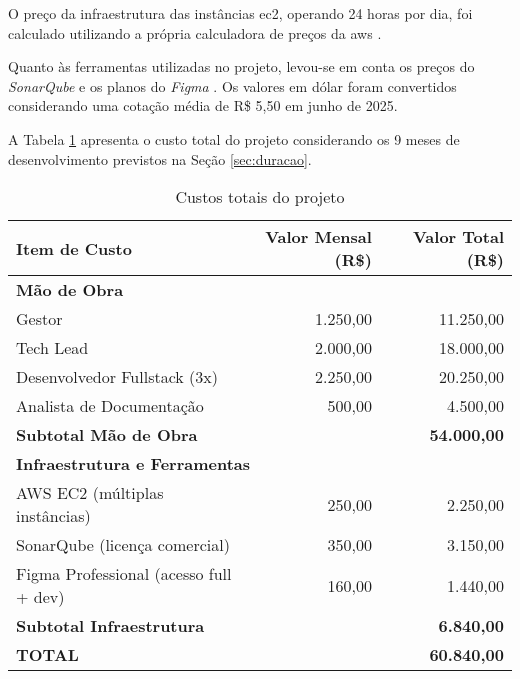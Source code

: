 O preço da infraestrutura das instâncias \gls{ec2}, operando 24 horas por dia, foi calculado utilizando a própria calculadora de preços da \gls{aws} \cite{aws-calculadora-2025}.

Quanto às ferramentas utilizadas no projeto, levou-se em conta os preços do \emph{SonarQube} \cite{sonarqube-preco-2025} e os planos do \emph{Figma} \cite{figma-preco-2025}. Os valores em dólar foram convertidos considerando uma cotação média de R\$ 5,50 em junho de 2025.

A Tabela \ref{tab:custo-total-projeto} apresenta o custo total do projeto considerando os 9 meses de desenvolvimento previstos na Seção \ref{sec:duracao}.

\begin{table}[htbp]
	\centering
	\caption{Custos totais do projeto}
	\label{tab:custo-total-projeto}
	\begin{tabular}{lrr}
		\toprule
		\textbf{Item de Custo} & \textbf{Valor Mensal (R\$)} & \textbf{Valor Total (R\$)} \\
		\midrule
		\multicolumn{3}{l}{\textbf{Mão de Obra}} \\
		\quad Gestor & 1.250,00 & 11.250,00 \\
		\quad Tech Lead & 2.000,00 & 18.000,00 \\
		\quad Desenvolvedor Fullstack (3x) & 2.250,00 & 20.250,00 \\
		\quad Analista de Documentação & 500,00 & 4.500,00 \\
		\cmidrule{3-3}
		\multicolumn{2}{l}{\textbf{Subtotal Mão de Obra}} & \textbf{54.000,00} \\
		\midrule
		\multicolumn{3}{l}{\textbf{Infraestrutura e Ferramentas}} \\
		\quad AWS EC2 (múltiplas instâncias) & 250,00 & 2.250,00 \\
		\quad SonarQube (licença comercial) & 350,00 & 3.150,00 \\
		\quad Figma Professional (acesso full + dev) & 160,00 & 1.440,00 \\
		\cmidrule{3-3}
		\multicolumn{2}{l}{\textbf{Subtotal Infraestrutura}} & \textbf{6.840,00} \\
		\midrule
		\multicolumn{2}{l}{\textbf{TOTAL}} & \textbf{60.840,00} \\
		\bottomrule
	\end{tabular}
\end{table}